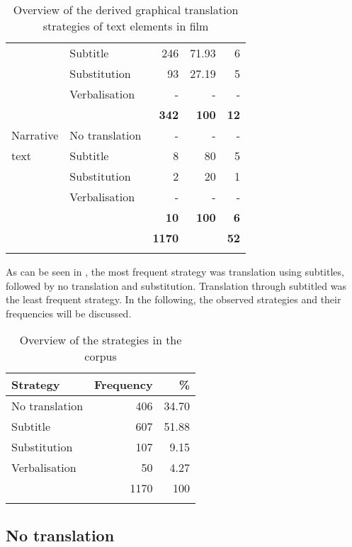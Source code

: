 \begin{table}
\begin{tabularx}{\textwidth}{lQrrr}
& Subtitle & 246 & 71.93 & 6\\
 & Substitution & 93 & 27.19 & 5\\
 & Verbalisation & - & - & -\\
 &  &  \textbf{342} &  \textbf{100} &  \textbf{12}\\
{Narrative } & No translation & - & - & -\\
text& Subtitle & 8 & 80 & 5\\
 & Substitution & 2 & 20 & 1\\
 & Verbalisation & - & - & -\\
 &  &  \textbf{10} &  \textbf{100} &  \textbf{6}\\
{} &  &  \textbf{1170} &  &  \textbf{52}\\
\lspbottomrule
\end{tabularx}
\caption{Overview of the derived graphical translation strategies of text elements in film}
\label{tab:TAB3}
\end{table}

As can be seen in , the most frequent strategy was translation using subtitles, followed by no translation and substitution. Translation through subtitled  was the least frequent strategy. In the following, the observed strategies and their frequencies will be discussed.

\begin{table}
\begin{tabularx}{\textwidth}{Qrr}
\lsptoprule
  {Strategy} &   {Frequency} &   {\%}\\
  \midrule 
 No translation & 406 & 34.70\\
 Subtitle & 607 & 51.88\\
 Substitution & 107 & 9.15\\
 Verbalisation & 50 & 4.27\\
 \midrule 
&  {1170} &  {100}\\
\lspbottomrule
\end{tabularx}
\caption{Overview of the strategies in the corpus}
\label{tab:TAB4}
\end{table}

\newpage
\subsection{No translation}\label{sec:2.5.1}

